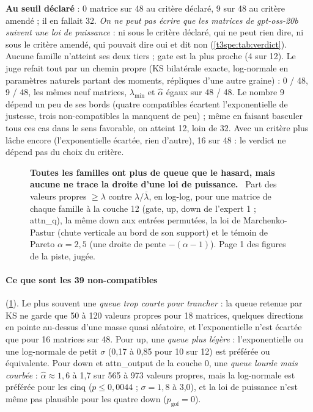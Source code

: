 \textbf{Au seuil déclaré} : 0 matrice sur 48 au critère déclaré, 9 sur 48 au critère amendé ; il en fallait 32. \emph{On ne peut pas écrire que les matrices de gpt-oss-20b suivent une loi de puissance} : ni sous le critère déclaré, qui ne peut rien dire, ni sous le critère amendé, qui pouvait dire oui et dit non (\cref{t3spe:tab:verdict}). Aucune famille n'atteint ses deux tiers ; gate est la plus proche (4 sur 12). Le juge refait tout par un chemin propre (KS bilatérale exacte, log-normale en paramètres naturels partant des moments, répliques d'une autre graine) : 0 / 48, 9 / 48, les mêmes neuf matrices, $\lambda_{\min}$ et $\hat\alpha$ égaux sur 48 / 48. Le nombre 9 dépend un peu de ses bords (quatre compatibles écartent l'exponentielle de justesse, trois non-compatibles la manquent de peu) ; même en faisant basculer tous ces cas dans le sens favorable, on atteint 12, loin de 32. Avec un critère plus lâche encore (l'exponentielle écartée, rien d'autre), 16 sur 48 : le verdict ne dépend pas du choix du critère.

\begin{figure}[tbp]
\centering
{}
\caption[La queue des spectres de la couche 12]{\textbf{Toutes les familles ont plus de queue que le hasard, mais aucune ne trace la droite d'une loi de puissance.} \mes~Part des valeurs propres $\ge \lambda$ contre $\lambda/\bar\lambda$, en log-log, pour une matrice de chaque famille à la couche 12 (gate, up, down de l'expert 1 ; attn\_q), la même down aux entrées permutées, la loi de Marchenko-Pastur (chute verticale au bord de son support) et le témoin de Pareto $\alpha = 2{,}5$ (une droite de pente $-(\alpha - 1)$). Page 1 des figures de la piste, jugée. \HorsStyle{}}
\label{fig:t3-spec-survie}
\end{figure}

\paragraph{Ce que sont les 39 non-compatibles} (\cref{fig:t3-spec-survie}). Le plus souvent une \emph{queue trop courte pour trancher} : la queue retenue par KS ne garde que 50 à 120 valeurs propres pour 18 matrices, quelques directions en pointe au-dessus d'une masse quasi aléatoire, et l'exponentielle n'est écartée que pour 16 matrices sur 48. Pour up, une \emph{queue plus légère} : l'exponentielle ou une log-normale de petit $\sigma$ (0,17 à 0,85 pour 10 sur 12) est préférée ou équivalente. Pour down et attn\_output de la couche 0, une \emph{queue lourde mais courbée} : $\hat\alpha \approx 1{,}6$ à 1,7 sur 565 à 973 valeurs propres, mais la log-normale est préférée pour les cinq ($p \le 0{,}0044$ ; $\sigma = 1{,}8$ à 3,0), et la loi de puissance n'est même pas plausible pour les quatre down ($p_{\mathrm{gof}} = 0$).

